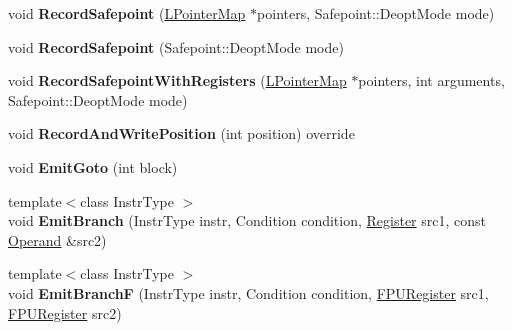 \begin{DoxyCompactItemize}
\item 
void {\bfseries Record\+Safepoint} (\hyperlink{classv8_1_1internal_1_1_l_pointer_map}{L\+Pointer\+Map} $\ast$pointers, Safepoint\+::\+Deopt\+Mode mode)\hypertarget{classv8_1_1internal_1_1_l_code_gen_a7f742e0bc068c384673a3490e15b230c}{}\label{classv8_1_1internal_1_1_l_code_gen_a7f742e0bc068c384673a3490e15b230c}

\item 
void {\bfseries Record\+Safepoint} (Safepoint\+::\+Deopt\+Mode mode)\hypertarget{classv8_1_1internal_1_1_l_code_gen_a3621dccea782082b57057f617a9dd24a}{}\label{classv8_1_1internal_1_1_l_code_gen_a3621dccea782082b57057f617a9dd24a}

\item 
void {\bfseries Record\+Safepoint\+With\+Registers} (\hyperlink{classv8_1_1internal_1_1_l_pointer_map}{L\+Pointer\+Map} $\ast$pointers, int arguments, Safepoint\+::\+Deopt\+Mode mode)\hypertarget{classv8_1_1internal_1_1_l_code_gen_a15c074803ff1d0270234efb3e8830c75}{}\label{classv8_1_1internal_1_1_l_code_gen_a15c074803ff1d0270234efb3e8830c75}

\item 
void {\bfseries Record\+And\+Write\+Position} (int position) override\hypertarget{classv8_1_1internal_1_1_l_code_gen_a7f2c2fb5fe21ed4f96fa43839a3c459d}{}\label{classv8_1_1internal_1_1_l_code_gen_a7f2c2fb5fe21ed4f96fa43839a3c459d}

\item 
void {\bfseries Emit\+Goto} (int block)\hypertarget{classv8_1_1internal_1_1_l_code_gen_a77ef06fc94dce505c88f628d129c114d}{}\label{classv8_1_1internal_1_1_l_code_gen_a77ef06fc94dce505c88f628d129c114d}

\item 
{\footnotesize template$<$class Instr\+Type $>$ }\\void {\bfseries Emit\+Branch} (Instr\+Type instr, Condition condition, \hyperlink{structv8_1_1internal_1_1_register}{Register} src1, const \hyperlink{classv8_1_1internal_1_1_operand}{Operand} \&src2)\hypertarget{classv8_1_1internal_1_1_l_code_gen_a4ae533afdcc614be4a85d3b541286053}{}\label{classv8_1_1internal_1_1_l_code_gen_a4ae533afdcc614be4a85d3b541286053}

\item 
{\footnotesize template$<$class Instr\+Type $>$ }\\void {\bfseries Emit\+BranchF} (Instr\+Type instr, Condition condition, \hyperlink{structv8_1_1internal_1_1_double_register}{F\+P\+U\+Register} src1, \hyperlink{structv8_1_1internal_1_1_double_register}{F\+P\+U\+Register} src2)\hypertarget{classv8_1_1internal_1_1_l_code_gen_a1a2d953ebfcde90d986e25142355669a}{}\label{classv8_1_1internal_1_1_l_code_gen_a1a2d953ebfcde90d986e25142355669a}


\end{DoxyCompactItemize}
